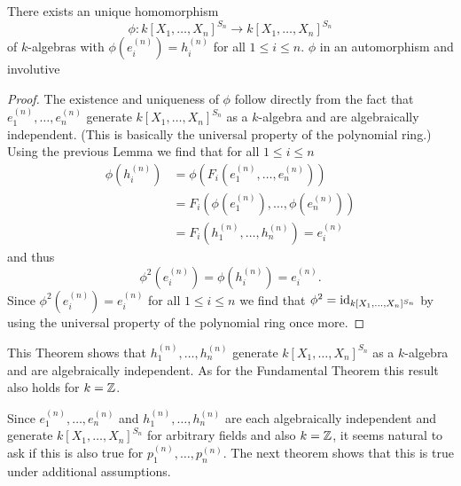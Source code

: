 \begin{thrm}
There exists an unique homomorphism
\[
 \phi \colon k[X_1, \dotsc, X_n]^{S_n} \to k[X_1, \dotsc, X_n]^{S_n}
\]
of $k$-algebras with $\phi\left(e^{(n)}_i\right) = h^{(n)}_i$ for all $1 \leq i \leq n$. $\phi$ in an automorphism and involutive
\end{thrm}
\begin{proof}
 The existence and uniqueness of $\phi$ follow directly from the fact that $e^{(n)}_1, \dotsc, e^{(n)}_n$ generate $k[X_1, \dotsc, X_n]^{S_n}$ as a $k$-algebra and are algebraically independent. (This is basically the universal property of the polynomial ring.) Using the previous Lemma we find that for all $1 \leq i \leq n$
 \begin{align*}
  \phi\left(h^{(n)}_i\right)
  &= \phi\left(F_i\left(e^{(n)}_1, \dotsc, e^{(n)}_n\right)\right) \\
  &= F_i\left(\phi\left(e^{(n)}_1\right), \dotsc, \phi\left(e^{(n)}_n\right)\right) \\
  &= F_i\left(h^{(n)}_1, \dotsc, h^{(n)}_n\right)
  = e^{(n)}_i
 \end{align*}
 and thus
 \[
  \phi^2\left(e^{(n)}_i\right) = \phi\left(h^{(n)}_i\right) = e^{(n)}_i.
 \]
 Since $\phi^2\left(e^{(n)}_i\right) = e^{(n)}_i$ for all $1 \leq i \leq n$ we find that $\phi^2 = \operatorname{id}_{k[X_1, \dotsc, X_n]^{S_n}}$ by using the universal property of the polynomial ring once more.
\end{proof}


This Theorem shows that $h^{(n)}_1, \dotsc, h^{(n)}_n$ generate $k[X_1, \dotsc, X_n]^{S_n}$ as a $k$-algebra and are algebraically independent. As for the Fundamental Theorem this result also holds for $k = \mathbb{Z}$.


Since $e^{(n)}_1, \dotsc, e^{(n)}_n$ and $h^{(n)}_1, \dotsc, h^{(n)}_n$ are each algebraically independent and generate $k[X_1, \dotsc, X_n]^{S_n}$ for arbitrary fields and also $k = \mathbb{Z}$, it seems natural to ask if this is also true for $p^{(n)}_1, \dotsc, p^{(n)}_n$. The next theorem shows that this is true under additional assumptions.


